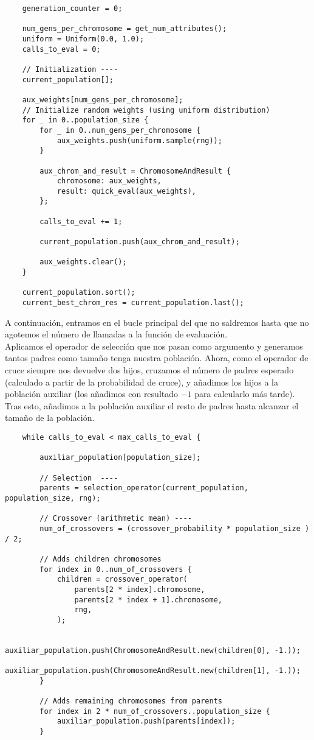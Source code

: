 \documentclass[size=a4, parskip=half, titlepage=false, toc=flat, toc=bib, 12pt]{scrartcl}
\begin{document}
\begin{verbatim}
    generation_counter = 0;

    num_gens_per_chromosome = get_num_attributes();
    uniform = Uniform(0.0, 1.0);
    calls_to_eval = 0;

    // Initialization ----
    current_population[];

    aux_weights[num_gens_per_chromosome];
    // Initialize random weights (using uniform distribution)
    for _ in 0..population_size {
        for _ in 0..num_gens_per_chromosome {
            aux_weights.push(uniform.sample(rng));
        }

        aux_chrom_and_result = ChromosomeAndResult {
            chromosome: aux_weights,
            result: quick_eval(aux_weights),
        };

        calls_to_eval += 1;

        current_population.push(aux_chrom_and_result);

        aux_weights.clear();
    }

    current_population.sort();
    current_best_chrom_res = current_population.last();
\end{verbatim}

A continuación, entramos en el bucle principal del que no saldremos hasta que no agotemos el número de llamadas a la función de evaluación. \\

Aplicamos el operador de selección que nos pasan como argumento y generamos tantos padres como tamaño tenga nuestra población. Ahora, como el operador de cruce siempre nos devuelve dos hijos, cruzamos el número de padres esperado (calculado a partir de la probabilidad de cruce), y añadimos los hijos a la población auxiliar (los añadimos con resultado $-1$ para calcularlo más tarde). Tras esto, añadimos a la población auxiliar el resto de padres hasta alcanzar el tamaño de la población.

\begin{verbatim}
    while calls_to_eval < max_calls_to_eval {

        auxiliar_population[population_size];

        // Selection  ----
        parents = selection_operator(current_population, population_size, rng);

        // Crossover (arithmetic mean) ----
        num_of_crossovers = (crossover_probability * population_size ) / 2;

        // Adds children chromosomes
        for index in 0..num_of_crossovers {
            children = crossover_operator(
                parents[2 * index].chromosome,
                parents[2 * index + 1].chromosome,
                rng,
            );

            auxiliar_population.push(ChromosomeAndResult.new(children[0], -1.));
            auxiliar_population.push(ChromosomeAndResult.new(children[1], -1.));
        }

        // Adds remaining chromosomes from parents
        for index in 2 * num_of_crossovers..population_size {
            auxiliar_population.push(parents[index]);
        }
\end{verbatim}
\end{document}

